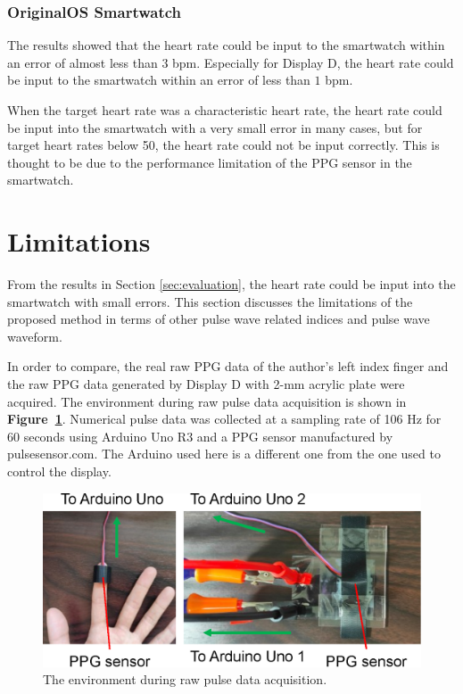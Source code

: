 \documentclass[sigchi,authordraft]{acmart}
\newcommand\figref[1]{\textbf{Figure~\ref{fig:#1}}}
\begin{document}
\subsubsection{OriginalOS Smartwatch}
The results showed that the heart rate could be input to the smartwatch within an error of almost less than $3$ bpm. Especially for Display D, the heart rate could be input to the smartwatch within an error of less than $1$ bpm.\par

When the target heart rate was a characteristic heart rate, the heart rate could be input into the smartwatch with a very small error in many cases, but for target heart rates below 50, the heart rate could not be input correctly. This is thought to be due to the performance limitation of the PPG sensor in the smartwatch.



\section{Limitations}
\label{sec:limitation}
From the results in Section \ref{sec:evaluation}, the heart rate could be input into the smartwatch with small errors. This section discusses the limitations of the proposed method in terms of other pulse wave related indices and pulse wave waveform.\par

In order to compare, the real raw PPG data of the author's left index finger and the raw PPG data generated by Display D with 2-mm acrylic plate were acquired. The environment during raw pulse data acquisition is shown in \figref{raw_data_acquisition}. Numerical pulse data was collected at a sampling rate of 106 Hz for 60 seconds using Arduino Uno R3 and a PPG sensor manufactured by pulsesensor.com. The Arduino used here is a different one from the one used to control the display.

\begin{figure}[!t]
  \centering
  \includegraphics[width=0.75\linewidth]{figures/raw_data_acquisition.eps}
  \caption{The environment during raw pulse data acquisition.}
  \label{fig:raw_data_acquisition}
\end{figure}
\end{document}

